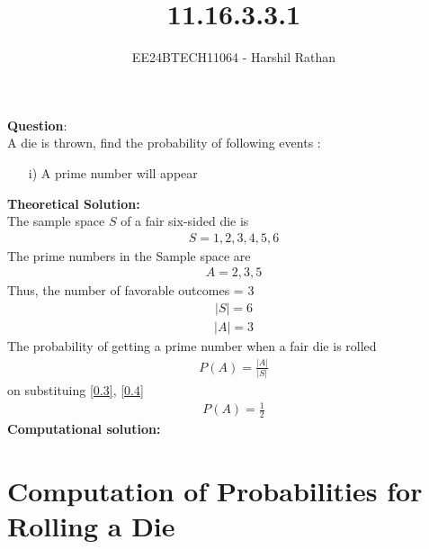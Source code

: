 \documentclass[journal]{IEEEtran}
\begin{document}

\vspace{3cm}

\title{11.16.3.3.1}
\author{EE24BTECH11064 - Harshil Rathan}
 \maketitle
{\let\newpage\relax\maketitle}

\renewcommand{\thefigure}{\theenumi}
\renewcommand{\thetable}{\theenumi}
\setlength{\intextsep}{10pt} %


\renewcommand{\thetable}{\theenumi}
\textbf{Question}:\\
A die is thrown, find the probability of following events : 
\begin{itemize}
    \item[i)] A prime number will appear 
\end{itemize}
\textbf{Theoretical Solution: }\\
The sample space $S$ of a fair six-sided die is
\begin{align}
    S = {1,2,3,4,5,6}
\end{align}
The prime numbers in the Sample space are 
\begin{align}
    A = {2,3,5}
\end{align}
Thus, the number of favorable outcomes = 3 
\begin{align}
    |S| = 6 
    \label{0.3}
\end{align}
\begin{align}
    |A| = 3 
    \label{0.4}
\end{align}
The probability of getting a prime number when a fair die is rolled
\begin{align}
    P(A) = \frac{|A|}{|S|}   
\end{align}
on substituing \ref{0.3}, \ref{0.4}
\begin{align}
    P(A) = \frac{1}{2}
\end{align}
\textbf{Computational solution: }\\

\section*{Computation of Probabilities for Rolling a Die}
\end{document}
